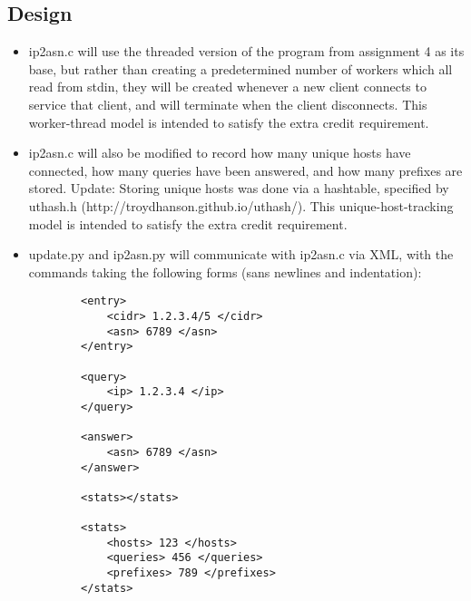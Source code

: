 \documentclass[letterpaper,10pt,fleqn]{article}
\numberwithin{equation}{section}
\begin{document}
\subsection*{Design}
\begin{itemize}
    \item ip2asn.c will use the threaded version of the program from assignment 4 as its base, but rather than creating a predetermined number of workers which all read from stdin, they will be created whenever a new client connects to service that client, and will terminate when the client disconnects.  This worker-thread model is intended to satisfy the extra credit requirement.
    \item ip2asn.c will also be modified to record how many unique hosts have connected, how many queries have been answered, and how many prefixes are stored.  Update: Storing unique hosts was done via a hashtable, specified by uthash.h (http://troydhanson.github.io/uthash/).  This unique-host-tracking model is intended to satisfy the extra credit requirement.
    \item update.py and ip2asn.py will communicate with ip2asn.c via XML, with the commands taking the following forms (sans newlines and indentation):
    \begin{verbatim}
        <entry>
            <cidr> 1.2.3.4/5 </cidr>
            <asn> 6789 </asn>
        </entry>

        <query>
            <ip> 1.2.3.4 </ip>
        </query>

        <answer>
            <asn> 6789 </asn>
        </answer>

        <stats></stats>

        <stats>
            <hosts> 123 </hosts>
            <queries> 456 </queries>
            <prefixes> 789 </prefixes>
        </stats>


\end{verbatim}
\end{itemize}
\end{document}
